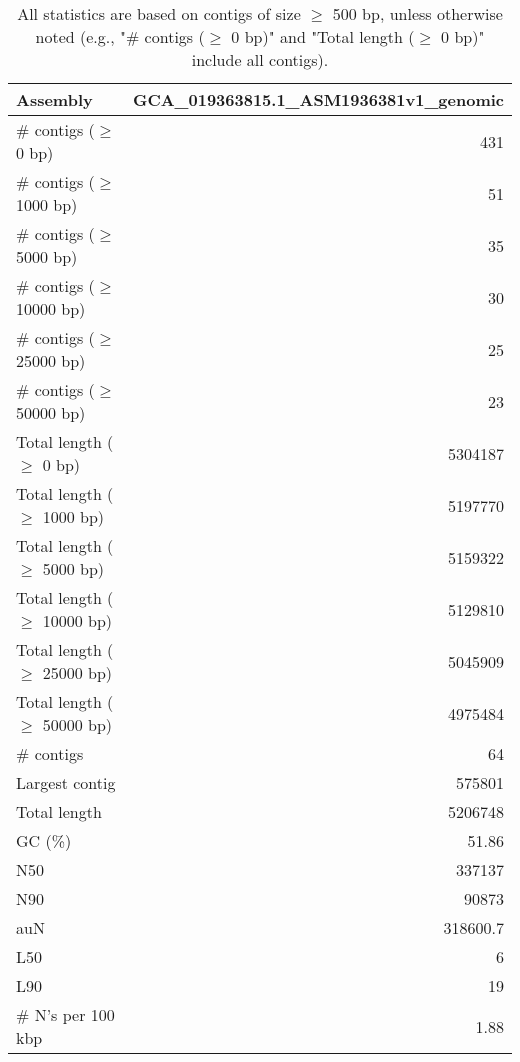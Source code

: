 \documentclass[12pt,a4paper]{article}
\begin{document}
\begin{table}[ht]
\begin{center}
\caption{All statistics are based on contigs of size $\geq$ 500 bp, unless otherwise noted (e.g., "\# contigs ($\geq$ 0 bp)" and "Total length ($\geq$ 0 bp)" include all contigs).}
\begin{tabular}{|l*{1}{|r}|}
\hline
Assembly & GCA\_019363815.1\_ASM1936381v1\_genomic \\ \hline
\# contigs ($\geq$ 0 bp) & 431 \\ \hline
\# contigs ($\geq$ 1000 bp) & 51 \\ \hline
\# contigs ($\geq$ 5000 bp) & 35 \\ \hline
\# contigs ($\geq$ 10000 bp) & 30 \\ \hline
\# contigs ($\geq$ 25000 bp) & 25 \\ \hline
\# contigs ($\geq$ 50000 bp) & 23 \\ \hline
Total length ($\geq$ 0 bp) & 5304187 \\ \hline
Total length ($\geq$ 1000 bp) & 5197770 \\ \hline
Total length ($\geq$ 5000 bp) & 5159322 \\ \hline
Total length ($\geq$ 10000 bp) & 5129810 \\ \hline
Total length ($\geq$ 25000 bp) & 5045909 \\ \hline
Total length ($\geq$ 50000 bp) & 4975484 \\ \hline
\# contigs & 64 \\ \hline
Largest contig & 575801 \\ \hline
Total length & 5206748 \\ \hline
GC (\%) & 51.86 \\ \hline
N50 & 337137 \\ \hline
N90 & 90873 \\ \hline
auN & 318600.7 \\ \hline
L50 & 6 \\ \hline
L90 & 19 \\ \hline
\# N's per 100 kbp & 1.88 \\ \hline
\end{tabular}
\end{center}
\end{table}
\end{document}
